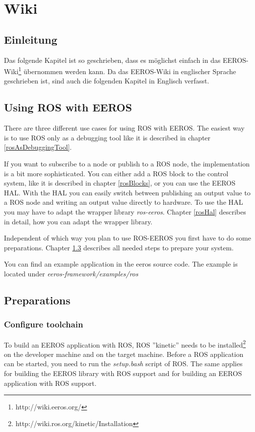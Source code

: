 \chapter{Wiki}
\label{chapter:wiki}
\section{Einleitung}
Das folgende Kapitel ist so geschrieben, dass es möglichst einfach in das EEROS-Wiki\footnote{http://wiki.eeros.org/} übernommen werden kann.
Da das EEROS-Wiki in englischer Sprache geschrieben ist, sind auch die folgenden Kapitel in Englisch verfasst.


\section{Using ROS with EEROS}	%
There are three different use cases for using ROS with EEROS.
The easiest way is to use ROS only as a debugging tool like it is described in chapter \ref{rosAsDebuggingTool}.

If you want to subscribe to a node or publish to a ROS node, the implementation is a bit more sophisticated.
You can either add a ROS block to the control system, like it is described in chapter \ref{rosBlocks}, or you can use the EEROS HAL.
With the HAL you can easily switch between publishing an output value to a ROS node and writing an output value directly to hardware.
To use the HAL you may have to adapt the wrapper library \textit{ros-eeros}.
Chapter \ref{rosHal} describes in detail, how you can adapt the wrapper library.

Independent of which way you plan to use ROS-EEROS you first have to do some preparations.
Chapter \ref{preparations} describes all needed steps to prepare your system.

You can find an example application in the eeros source code.
The example is located under \textit{eeros-framework/examples/ros}


\section{Preparations}
\label{preparations}
\subsection{Configure toolchain}
\label{configureToolchain}
To build an EEROS application with ROS, ROS ''kinetic'' needs to be installed\footnote{http://wiki.ros.org/kinetic/Installation} on the developer machine and on the target machine.
Before a ROS application can be started, you need to run the \textit{setup.bash} script of ROS.
The same applies for building the EEROS library with ROS support and for building an EEROS application with ROS support.

